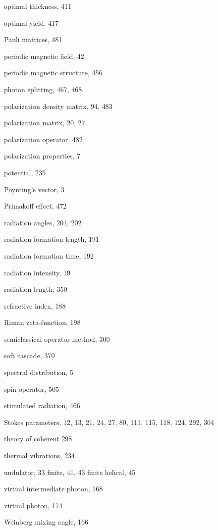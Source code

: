 \begin{theindex}
  \indexspace

  \item optimal thickness, 411
  \item optimal yield, 417

  \indexspace

  \item Pauli matrices, 481
  \item periodic magnetic field, 42
  \item periodic magnetic structure, 456
  \item photon splitting, 467, 468
  \item polarization density matrix, 94, 483
  \item polarization matrix, 20, 27
  \item polarization operator, 482
  \item polarization properties, 7
  \item potential, 235
  \item Poynting's vector, 3
  \item Primakoff effect, 472

\indexspace

  \item radiation angles, 201, 202
 
\vfill
\pagebreak


  \item radiation formation length, 191
  \item radiation formation time, 192
  \item radiation intensity, 19
  \item radiation length, 350
  \item refractive index, 188
  \item Riman zeta-function, 198

  \indexspace

  \item semiclassical operator method, 300
  \item soft cascade, 370
  \item spectral distribution, 5
  \item spin operator, 505
  \item stimulated radiation, 466
  \item Stokes parameters, 12, 13, 21, 24, 27, 80, 111, 115,
118, 124, 292, 304

  \indexspace

  \item theory of coherent 298
  \item thermal vibrations, 234

  \indexspace

  \item undulator, 33
  \subitem finite, 41, 43
  \subitem finite helical, 45

  \indexspace

  \item virtual intermediate photon, 168
  \item virtual photon, 174

  \indexspace

  \item Weinberg mixing angle, 166

\end{theindex}

